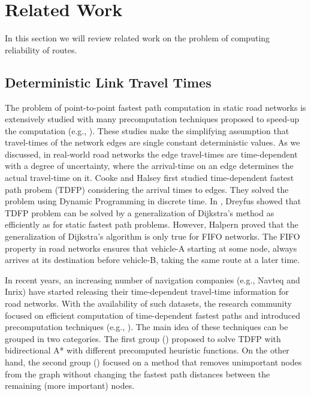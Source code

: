 \section{Related Work}
\label{sec:related}
In this section we will review related work on the problem of computing reliability of routes.

\subsection{Deterministic Link Travel Times}
The problem of point-to-point fastest path computation in static road networks
is extensively studied with many precomputation techniques proposed to speed-up
the computation (e.g., \cite{Samet08,Goldberg05}). These studies
make the simplifying assumption that travel-times of the network edges are single constant deterministic values. As we discussed, in real-world road networks the edge travel-times are time-dependent with a degree of uncertainty, where the arrival-time on an edge determines the
actual travel-time on it. Cooke and Halsey \cite{Cooke66} first studied time-dependent fastest
path probem (TDFP) considering the arrival times to edges. They solved the
problem using Dynamic Programming in discrete time. In \cite{Dreyfus69}, Dreyfus
showed that TDFP problem can be solved by a generalization of Dijkstra's method as efficiently as for static fastest path problems.
However, Halpern \cite{Halpern77} proved that the generalization of Dijkstra's algorithm is only true for FIFO networks. The FIFO property in road networks ensures that
vehicle-A starting at some node, always arrives at its destination before
vehicle-B, taking the same route at a later time.

In recent years, an increasing number of navigation companies (e.g., Navteq and
Inrix) have started releasing their time-dependent travel-time information for
road networks. With the availability of such datasets, the research community focused on
efficient computation of time-dependent fastest paths and introduced
precomputation techniques (e.g., \cite{Nannicini08,Delling08,
Batz10,Demiryurek11}). The main idea of these
techniques can be grouped in two categories. The first group 
(\cite{Nannicini08,Demiryurek11}) proposed  to solve
TDFP with bidirectional A* with different precomputed heuristic functions. On
the other hand, the second group
(\cite{Delling08,Batz10})  focused on a method that
removes unimportant nodes from the graph without changing the fastest path distances between the remaining (more important) nodes.

